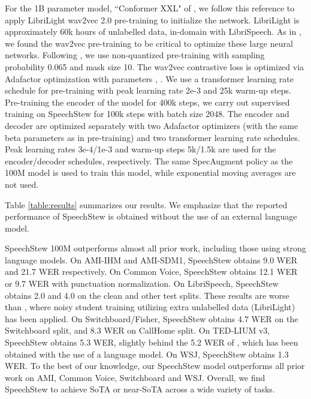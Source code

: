 \documentclass[a4paper]{article}
\begin{document}
For the 1B parameter model, ``Conformer XXL" of \cite{zhang-arxiv-2020}, we follow this reference to apply LibriLight wav2vec 2.0 \cite{baevski-arxiv-2020} pre-training to initialize the network. LibriLight \cite{kahn-arxiv-2019} is approximately 60k hours of unlabelled data, in-domain with LibriSpeech. As in \cite{zhang-arxiv-2020}, we found the wav2vec pre-training to be critical to optimize these large neural networks. Following \cite{baevski-arxiv-2020}, we use non-quantized pre-training with sampling probability 0.065 and mask size 10. The wav2vec contrastive loss is optimized via Adafactor optimization \cite{shazeer-icml-2018} with parameters , . We use a transformer learning rate schedule for pre-training with peak learning rate 2e-3 and 25k warm-up steps. Pre-training the encoder of the model for 400k steps, we carry out supervised training on SpeechStew for 100k steps with batch size 2048. The encoder and decoder are optimized separately with two Adafactor optimizers (with the same beta parameters as in pre-training) and two transformer learning rate schedules. Peak learning rates 3e-4/1e-3 and warm-up steps 5k/1.5k are used for the encoder/decoder schedules, respectively. The same SpecAugment policy as the 100M model is used to train this model, while exponential moving averages are not used.

Table \ref{table:results} summarizes our results. We emphasize that the reported performance of SpeechStew is obtained without the use of an external language model.

SpeechStew 100M outperforms almost all prior work, including those using strong language models. On AMI-IHM and AMI-SDM1, SpeechStew obtains 9.0 WER and 21.7 WER respectively. On Common Voice, SpeechStew obtains 12.1 WER or 9.7 WER with punctuation normalization. On LibriSpeech, SpeechStew obtains 2.0 and 4.0 on the clean and other test splits. These results are worse than \cite{zhang-arxiv-2020}, where noisy student training \cite{park-interspeech-2020} utilizing extra unlabelled data (LibriLight) has been applied.
On Switchboard/Fisher, SpeechStew obtains 4.7 WER on the Switchboard split, and 8.3 WER on CallHome split. On TED-LIUM v3, SpeechStew obtains 5.3 WER, slightly behind the 5.2 WER of \cite{likhomanenko-arxiv-2020}, which has been obtained with the use of a language model. On WSJ, SpeechStew obtains 1.3 WER. To the best of our knowledge, our SpeechStew model outperforms all prior work on AMI, Common Voice, Switchboard and WSJ. Overall, we find SpeechStew to achieve SoTA or near-SoTA across a wide variety of tasks.
\end{document}
